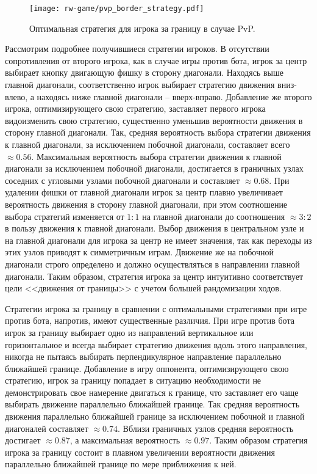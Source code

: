 \begin{figure}[t]
    \centering
    \texttt{[image: rw-game/pvp\_border\_strategy.pdf]}
    \caption{
        Оптимальная стратегия для игрока за границу в случае PvP.
    }  
    \label{fig:optimal-strategy-pvp-border}
    
\end{figure}

Рассмотрим подробнее получившиеся стратегии игроков. В отсутствии сопротивления от второго игрока, как в случае игры против бота, игрок за центр выбирает кнопку двигающую фишку в сторону диагонали. Находясь выше главной диагонали, соответственно игрок выбирает стратегию движения вниз-влево, а находясь ниже главной диагонали -- вверх-вправо. Добавление же второго игрока, оптимизирующего свою стратегию, заставляет первого игрока видоизменить свою стратегию, существенно уменьшив вероятности движения в сторону главной диагонали. Так, средняя вероятность выбора стратегии движения к главной диагонали, за исключением побочной диагонали, составляет всего $\approx 0.56$. Максимальная вероятность выбора стратегии движения к главной диагонали за исключением побочной диагонали, достигается в граничных узлах соседних с угловыми узлами побочной диагонали и составляет $\approx 0.68$. При удалении фишки от главной диагонали игрок за центр плавно увеличивает вероятность движения в сторону главной диагонали, при этом соотношение выбора стратегий изменяется от $1:1$ на главной диагонали до соотношения $\approx 3:2$ в пользу движения к главной диагонали. Выбор движения в центральном узле и на главной диагонали для игрока за центр не имеет значения, так как переходы из этих узлов приводят к симметричным играм. Движение же на побочной диагонали строго определено и должно осуществляться в направлении главной диагонали. Таким образом, стратегия игрока за центр интуитивно соответствует цели <<движения от границы>> с учетом большей рандомизации ходов.

Стратегии игрока за границу в сравнении с оптимальными стратегиями при игре против бота, напротив, имеют существенные различия. При игре против бота игрок за границу выбирает одно из направлений вертикальное или горизонтальное и всегда выбирает стратегию движения вдоль этого направления, никогда не пытаясь выбирать перпендикулярное направление параллельно ближайшей границе. Добавление в игру оппонента, оптимизирующего свою стратегию, игрок за границу попадает в ситуацию необходимости не демонстрировать свое намерение двигаться к границе, что заставляет его чаще выбирать движение параллельно ближайшей границе. Так средняя вероятность движения параллельно ближайшей границе за исключением побочной и главной диагоналей составляет $\approx 0.74$. Вблизи граничных узлов средняя вероятность достигает $\approx 0.87$, а максимальная вероятность $\approx 0.97$. Таким образом стратегия игрока за границу состоит в плавном увеличении вероятности движения параллельно ближайшей границе по мере приближения к ней. 


